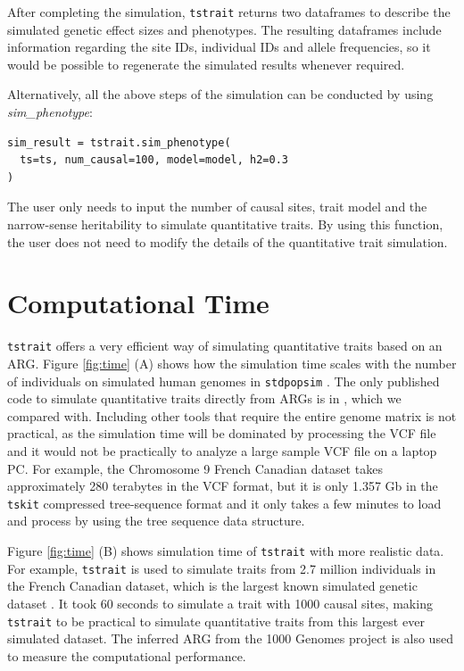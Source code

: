 \documentclass[unnumsec,webpdf,modern,large,namedate]{oup-authoring-template}%
\theoremstyle{thmstyleone}%
\theoremstyle{thmstyletwo}%
\theoremstyle{thmstylethree}%
\begin{document}
After completing the simulation, \texttt{tstrait} returns two dataframes to describe the simulated genetic effect sizes and phenotypes. The resulting dataframes include information regarding the site IDs, individual IDs and allele frequencies, so it would be possible to regenerate the simulated results whenever required.

Alternatively, all the above steps of the simulation can be conducted by using \emph{sim\_phenotype}:
\begin{verbatim}
sim_result = tstrait.sim_phenotype(
  ts=ts, num_causal=100, model=model, h2=0.3
)
\end{verbatim}
The user only needs to input the number of causal sites, trait model and the narrow-sense heritability to simulate quantitative traits. By using this function, the user does not need to modify the details of the quantitative trait simulation.

\section{Computational Time}

\texttt{tstrait} offers a very efficient way of simulating quantitative traits based on an ARG. Figure \ref{fig:time} (A) shows how the simulation time scales with the number of individuals on simulated human genomes in \texttt{stdpopsim} \citep{adrion2020}. The only published code to simulate quantitative traits directly from ARGs is in \cite{martin2017}, which we compared with. Including other tools that require the entire genome matrix is not practical, as the simulation time will be dominated by processing the VCF file and it would not be practically to analyze a large sample VCF file on a laptop PC. For example, the Chromosome 9 French Canadian dataset takes approximately 280 terabytes in the VCF format, but it is only 1.357 Gb in the \texttt{tskit} compressed tree-sequence format and it only takes a few minutes to load and process by using the tree sequence data structure.

Figure \ref{fig:time} (B) shows simulation time of \texttt{tstrait} with more realistic data. For example, \texttt{tstrait} is used to simulate traits from 2.7 million individuals in the French Canadian dataset, which is the largest known simulated genetic dataset \citep{anderson2023}. It took 60 seconds to simulate a trait with 1000 causal sites, making \texttt{tstrait} to be practical to simulate quantitative traits from this largest ever simulated dataset. The inferred ARG from the 1000 Genomes project \citep{kelleher2019} is also used to measure the computational performance.
\end{document}
